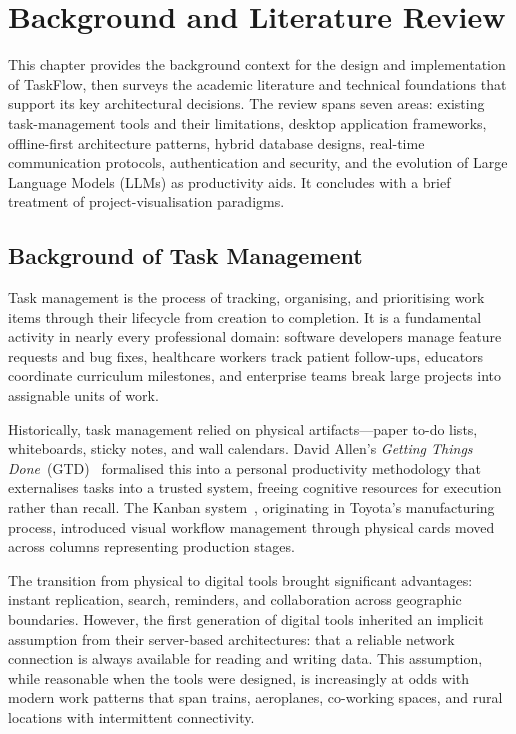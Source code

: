 \chapter{Background and Literature Review}\label{chap:background}

This chapter provides the background context for the design and implementation of
TaskFlow, then surveys the academic literature and technical foundations that support
its key architectural decisions.
The review spans seven areas: existing task-management tools and their limitations,
desktop application frameworks, offline-first architecture patterns, hybrid database
designs, real-time communication protocols, authentication and security, and the
evolution of Large Language Models (LLMs) as productivity aids.
It concludes with a brief treatment of project-visualisation paradigms.

\section{Background of Task Management}\label{sec:bg_background}

Task management is the process of tracking, organising, and prioritising work items
through their lifecycle from creation to completion.
It is a fundamental activity in nearly every professional domain: software developers
manage feature requests and bug fixes, healthcare workers track patient follow-ups,
educators coordinate curriculum milestones, and enterprise teams break large projects
into assignable units of work.

Historically, task management relied on physical artifacts---paper to-do lists,
whiteboards, sticky notes, and wall calendars.
David Allen's \emph{Getting Things Done}~(GTD)~\cite{allen2001gtd} formalised this
into a personal productivity methodology that externalises tasks into a trusted system,
freeing cognitive resources for execution rather than recall.
The Kanban system~\cite{anderson2010kanban}, originating in Toyota's manufacturing
process, introduced visual workflow management through physical cards moved across
columns representing production stages.

The transition from physical to digital tools brought significant advantages:
instant replication, search, reminders, and collaboration across geographic boundaries.
However, the first generation of digital tools inherited an implicit assumption from
their server-based architectures: that a reliable network connection is always
available for reading and writing data.
This assumption, while reasonable when the tools were designed, is increasingly at
odds with modern work patterns that span trains, aeroplanes, co-working spaces, and
rural locations with intermittent connectivity.

